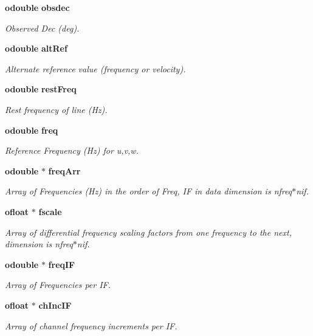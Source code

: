 \begin{CompactItemize}
{\bf odouble} {\bf obsdec}
\begin{CompactList}\small\item\em Observed Dec (deg). \item\end{CompactList}\item 
{\bf odouble} {\bf alt\-Ref}
\begin{CompactList}\small\item\em Alternate reference value (frequency or velocity). \item\end{CompactList}\item 
{\bf odouble} {\bf rest\-Freq}
\begin{CompactList}\small\item\em Rest frequency of line (Hz). \item\end{CompactList}\item 
{\bf odouble} {\bf freq}
\begin{CompactList}\small\item\em Reference Frequency (Hz) for u,v,w. \item\end{CompactList}\item 
{\bf odouble} $\ast$ {\bf freq\-Arr}
\begin{CompactList}\small\item\em Array of Frequencies (Hz) in the order of Freq, IF in data dimension is nfreq$\ast$nif. \item\end{CompactList}\item 
{\bf ofloat} $\ast$ {\bf fscale}
\begin{CompactList}\small\item\em Array of differential frequency scaling factors from one frequency to the next, dimension is nfreq$\ast$nif. \item\end{CompactList}\item 
{\bf odouble} $\ast$ {\bf freq\-IF}
\begin{CompactList}\small\item\em Array of Frequencies per IF. \item\end{CompactList}\item 
{\bf ofloat} $\ast$ {\bf ch\-Inc\-IF}
\begin{CompactList}\small\item\em Array of channel frequency increments per IF. \item\end{CompactList}\item 

\end{CompactItemize}
